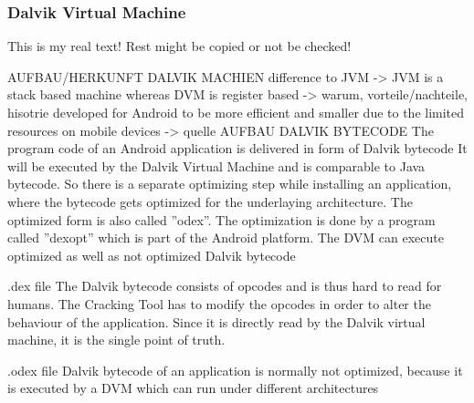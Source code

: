 \subsubsection{Dalvik Virtual Machine} \label{subsubsection:android-evolution-dvm}
This is my real text! Rest might be copied or not be checked!








AUFBAU/HERKUNFT DALVIK MACHIEN\newline
difference to JVM -> JVM is a stack based machine whereas DVM is register based -> warum, vorteile/nachteile, hisotrie\newline
developed for Android to be more efficient and smaller due to the limited resources on mobile devices -> quelle\newline
AUFBAU DALVIK BYTECODE\newline
The program code of an Android application is delivered in form of Dalvik bytecode\newline
It will be executed by the Dalvik Virtual Machine and is comparable to Java bytecode. So there is a separate
optimizing step while installing an application, where the bytecode gets optimized for the underlaying architecture. The optimized form is also called ”odex”. The optimization is done by a program called ”dexopt” which is part of the Android platform. The DVM can execute optimized as well as not optimized Dalvik bytecode\newline

.dex file
The Dalvik bytecode consists of opcodes and is thus hard to read for humans. The Cracking Tool has to modify the opcodes in order to alter the behaviour of the application. Since it is directly read by the Dalvik virtual machine, it is the single point of truth.\newline

.odex file
Dalvik bytecode of an application is normally not optimized, because it is executed by a DVM which can run under different architectures\newline

